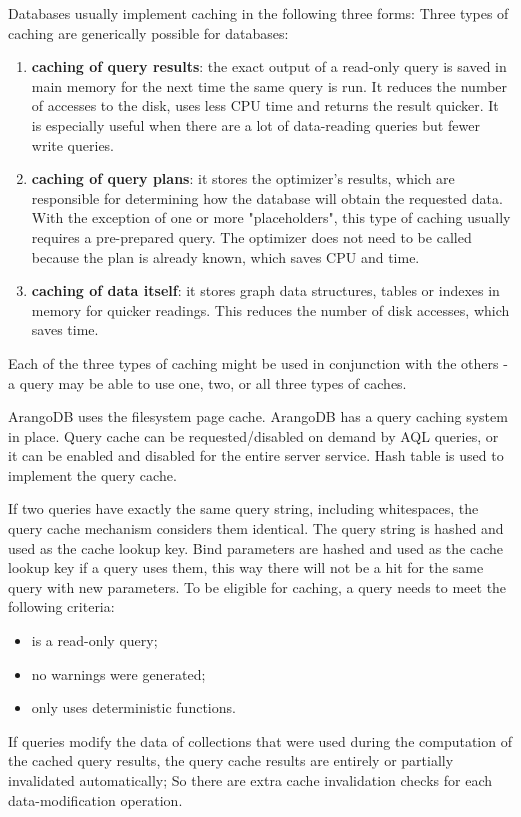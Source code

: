Databases usually implement caching in the following three forms:
Three types of caching are generically possible for databases:
 \begin{enumerate}[noitemsep]
	\item \textbf{caching of query results}:
		  the exact output of a read-only query is saved in main memory for the next time the same query is run.
		  It reduces the number of accesses to the disk, uses less CPU time and returns the result quicker.
		  It is especially useful when there are a lot of data-reading queries but fewer write queries.
	\item \textbf{caching of query plans}:
		  it stores the optimizer's results, which are responsible for determining how the database will obtain the requested data.
		  With the exception of one or more "placeholders", this type of caching usually requires a pre-prepared query.
		  The optimizer does not need to be called because the plan is already known, which saves CPU and time.
	\item \textbf{caching of data itself}:
		  it stores graph data structures, tables or indexes in memory for quicker readings.
		  This reduces the number of disk accesses, which saves time.
\end{enumerate}
Each of the three types of caching might be used in conjunction with the others - a query may be able to use one, two, or all three types of caches.

ArangoDB uses the filesystem page cache.
ArangoDB has a query caching system in place.
Query cache can be requested/disabled on demand by \acrshort{AQL} queries, or it can be enabled and disabled for the entire server service.
Hash table is used to implement the query cache.

If two queries have exactly the same query string, including whitespaces, the query cache mechanism considers them identical.
The query string is hashed and used as the cache lookup key.
Bind parameters are hashed and used as the cache lookup key if a query uses them, this way there will not be a hit for the same query with new parameters.
To be eligible for caching, a query needs to meet the following criteria:
 \begin{itemize}[noitemsep]
	\item is a read-only query;
	\item no warnings were generated;
	\item only uses deterministic functions.
\end{itemize}
If queries modify the data of collections that were used during the computation of the cached query results, the query cache results are entirely or partially invalidated automatically;
So there are extra cache invalidation checks for each data-modification operation.


